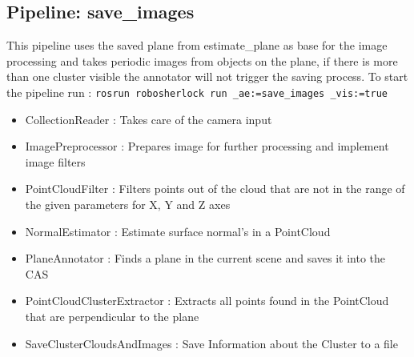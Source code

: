 \documentclass[main.tex]{subfiles}
\begin{document}
            \subsection{Pipeline: save\_images}
This pipeline uses the saved plane from estimate\_plane as base for the image processing and takes periodic images from objects on the plane, if there is more than one cluster visible the annotator will not trigger the saving process. To start the pipeline run : \texttt{rosrun robosherlock run \_ae:=save\_images \_vis:=true} 
\begin{itemize}
    \item CollectionReader : Takes care of the camera input
    \item ImagePreprocessor : Prepares image for further processing and implement image filters  
    \item PointCloudFilter : Filters points out of the cloud that are not in the range of the given parameters for X, Y and Z axes
    \item NormalEstimator : Estimate surface normal's in a PointCloud 
    \item PlaneAnnotator : Finds a plane in the current scene and saves it into the CAS
    \item PointCloudClusterExtractor : Extracts all points found in the PointCloud that are perpendicular to the plane 
    \item SaveClusterCloudsAndImages : Save Information about the Cluster to a file 
\end{itemize}
\end{document}
